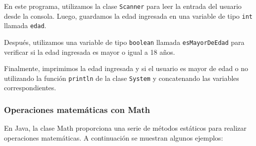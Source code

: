 \documentclass{article}
\begin{document}
En este programa, utilizamos la clase \lstinline{Scanner} para leer la entrada del usuario desde la consola. Luego, guardamos la edad ingresada en una variable de tipo \lstinline{int} llamada \lstinline{edad}.

Después, utilizamos una variable de tipo \lstinline{boolean} llamada \lstinline{esMayorDeEdad} para verificar si la edad ingresada es mayor o igual a 18 años.

Finalmente, imprimimos la edad ingresada y si el usuario es mayor de edad o no utilizando la función \lstinline{println} de la clase \lstinline{System} y concatenando las variables correspondientes.

\subsubsection{Operaciones matemáticas con Math}
En Java, la clase Math proporciona una serie de métodos estáticos para realizar operaciones matemáticas. A continuación se muestran algunos ejemplos:
\end{document}
